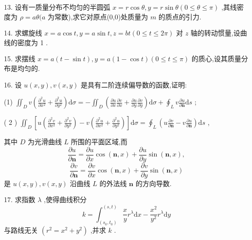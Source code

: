 13. 设有一质量分布不均匀的半圆弧 \(x = r\cos \theta ,y = r\sin \theta \left( {0 \leq  \theta  \leq  \pi }\right)\) ,其线密度为 \(\rho  = {a\theta }(a\) 为常数),求它对原点(0,0)处质量为 \(m\) 的质点的引力.

14. 求螺旋线 \(x = a\cos t,y = a\sin t,z = {bt}\left( {0 \leq  t \leq  {2\pi }}\right)\) 对 \(z\) 轴的转动惯量,设曲线的密度为 1 .

15. 求摆线 \(x = a\left( {t - \sin t}\right) ,y = a\left( {1 - \cos t}\right) \left( {0 \leq  t \leq  \pi }\right)\) 的质心,设其质量分布是均匀的.

16. 设 \(u\left( {x,y}\right) ,v\left( {x,y}\right)\) 是具有二阶连续偏导数的函数,证明:

(1) \({\iint }_{D}v\left( {\frac{{\partial }^{2}u}{\partial {x}^{2}} + \frac{{\partial }^{2}u}{\partial {y}^{2}}}\right) \mathrm{d}\sigma  =  - {\iint }_{D}\left( {\frac{\partial u}{\partial x}\frac{\partial v}{\partial x} + \frac{\partial u}{\partial y}\frac{\partial v}{\partial y}}\right) \mathrm{d}\sigma  + {\oint }_{L}v\frac{\partial u}{\partial \mathbf{n}}\mathrm{d}s\) ;

( 2 ) \({\iint }_{D}\left\lbrack  {u\left( {\frac{{\partial }^{2}v}{\partial {x}^{2}} + \frac{{\partial }^{2}v}{\partial {y}^{2}}}\right)  - v\left( {\frac{{\partial }^{2}u}{\partial {x}^{2}} + \frac{{\partial }^{2}u}{\partial {y}^{2}}}\right) }\right\rbrack  \mathrm{d}\sigma  = {\oint }_{L}\left( {u\frac{\partial v}{\partial \mathbf{n}} - v\frac{\partial u}{\partial \mathbf{n}}}\right) \mathrm{d}s\) ,

其中 \(D\) 为光滑曲线 \(L\) 所围的平面区域,而
\[
\frac{\partial u}{\partial \mathbf{n}} = \frac{\partial u}{\partial x}\cos \left( {\mathbf{n},x}\right)  + \frac{\partial u}{\partial y}\sin \left( {\mathbf{n},x}\right) ,
\]
\[
\frac{\partial v}{\partial \mathbf{n}} = \frac{\partial v}{\partial x}\cos \left( {\mathbf{n},x}\right)  + \frac{\partial v}{\partial y}\sin \left( {\mathbf{n},x}\right)
\]
是 \(u\left( {x,y}\right) ,v\left( {x,y}\right)\) 沿曲线 \(L\) 的外法线 \(\mathbf{n}\) 的方向导数.

17. 求指数 \(\lambda\) ,使得曲线积分
\[
k = {\int }_{\left( {s}_{0},{t}_{0}\right) }^{\left( s,t\right) }\frac{x}{y}{r}^{\lambda }\mathrm{d}x - \frac{{x}^{2}}{{y}^{2}}{r}^{\lambda }\mathrm{d}y
\]
与路线无关 \(\left( {{r}^{2} = {x}^{2} + {y}^{2}}\right)\) ,并求 \(k\) .

